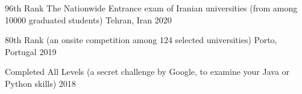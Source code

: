 

\begin{cvhonors}

  \cvhonor
    {96th Rank} %
    {The Nationwide Entrance exam of Iranian universities (from among 10000 graduated students)} %
    {Tehran, Iran} %
    {2020} %

  \cvhonor
    {80th Rank} %
    { (an onsite competition among 124 selected universities)} %
    {Porto, Portugal} %
    {2019} %

  \cvhonor
    {Completed All Levels} %
    { (a secret challenge by Google, to examine your Java or Python skills)} %
    {} %
    {2018} %




\end{cvhonors}
